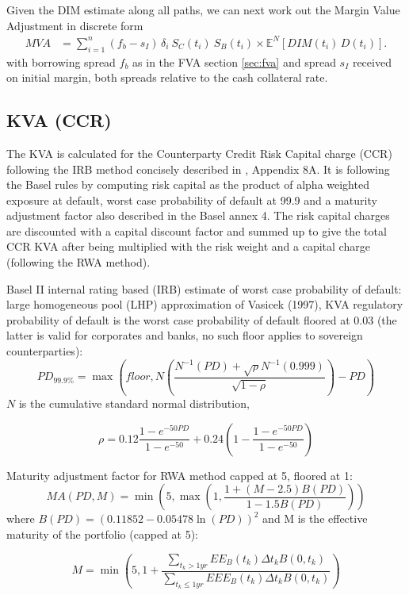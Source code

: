 \documentclass[12pt, a4paper]{article}
\newcommand\E{\ensuremath{\mathbb{E}}}
\newcommand{\MVA}{\mathit{MVA}}
\newcommand{\EE}{\mathit{EE}}
\newcommand{\EEE}{\mathit{EEE}}
\newcommand{\PD}{\mathit{PD}}
\newcommand{\DIM}{\mathit{DIM}}
\newcommand{\MA}{\mathit{MA}}
\begin{document}
{\begin{appendix}
\medskip
Given the DIM estimate along all paths, we can next work out the Margin Value Adjustment \cite{Lichters} in discrete form
\begin{align}
\MVA &= \sum_{i=1}^n (f_b - s_I)\, \delta_i\: S_C(t_i)\: S_B(t_i) \times \E^N\left[
\DIM(t_i)\,D(t_i)\right]. \label{MVA} 
\end{align}
with borrowing spread $f_b$ as in the FVA section \ref{sec:fva} and spread $s_I$ received on initial margin, both
spreads relative to the cash collateral rate.

\subsection{KVA (CCR)}\label{sec:app_kva}

The KVA is calculated for the Counterparty Credit Risk Capital charge
(CCR) following the IRB method concisely  described in
\cite{Gregory15}, Appendix 8A.
It is following the Basel rules by computing risk capital as the
product of alpha weighted  exposure at default, worst case probability
of default at 99.9  and a maturity adjustment factor also described in
the Basel annex 4.
The risk capital charges are discounted with a capital discount factor
and summed up to  give the total CCR KVA after being multiplied with
the risk  weight and a capital charge (following the RWA method).

\medskip Basel II internal rating based (IRB) estimate of worst case
probability of  default: large homogeneous pool (LHP) approximation of
Vasicek (1997), KVA regulatory probability of default is the worst
case probability of default floored at 0.03 (the latter is valid for 
corporates and banks, no such floor applies to sovereign counterparties):
$$
\PD_{99.9\%} = \max\left(floor, N \left(\frac{N^{-1}(\PD) + \sqrt{\rho}
  N^{-1}(0.999)}{\sqrt{1 - \rho}}\right) - \PD\right)
$$
$N$ is the cumulative standard normal distribution,

$$
\rho = 0.12 \frac{1 - e^{-50 \PD}}{1 - e^{-50}} + 0.24 \left(1 - \frac{1 -
  e^{-50 \PD}}{1 - e^{-50}}\right)
$$

\medskip Maturity adjustment factor for RWA method capped at 5, floored at 1:
$$
\MA(\PD, M) = \min\left(5, \max\left(1, \frac{1 + (M - 2.5) B(\PD)}{1 - 1.5 B(\PD)}\right)\right)
$$
\medskip where $B(\PD) = (0.11852 - 0.05478 \ln(\PD))^2$ and M is the
effective  maturity of the portfolio (capped at 5):

$$M = \min\left(5, 1 + \frac{\sum\limits_{t_k > 1yr} \EE_B(t_k)\Delta t_k
  B(0,t_k)}{\sum\limits_{t_k \leq 1yr} \EEE_B(t_k)\Delta t_k B(0,t_k)}\right)
$$


\end{appendix}}
\end{document}
